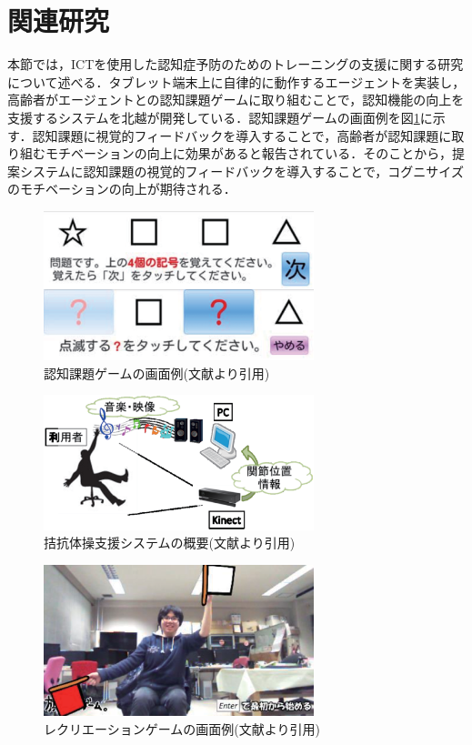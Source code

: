 \section{関連研究}
本節では，ICTを使用した認知症予防のためのトレーニングの支援に関する研究について述べる．タブレット端末上に自律的に動作するエージェントを実装し，高齢者がエージェントとの認知課題ゲームに取り組むことで，認知機能の向上を支援するシステム\cite{記憶力ゲーム}を北越が開発している．認知課題ゲームの画面例を図\ref{fig:cognition_system}に示す．認知課題に視覚的フィードバックを導入することで，高齢者が認知課題に取り組むモチベーションの向上に効果があると報告されている．そのことから，提案システムに認知課題の視覚的フィードバックを導入することで，コグニサイズのモチベーションの向上が期待される．



\begin{figure}[tbp]
	\centering
			\includegraphics[width=0.7\textwidth]{chap1-figure/cognition_system.eps}
	\caption{認知課題ゲームの画面例(文献\cite{記憶力ゲーム}より引用)}
	\label{fig:cognition_system}
\end{figure}

\begin{figure}[tbp]
	\centering
			\includegraphics[width=0.7\textwidth]{chap1-figure/antagonism_system.eps}
	\caption{拮抗体操支援システムの概要(文献より引用)}
	\label{fig:antagonism_system}
\end{figure}

\begin{figure}[tbp]
	\centering
			\includegraphics[width=0.7\textwidth]{chap1-figure/upper_limbs_system.eps}
	\caption{レクリエーションゲームの画面例(文献より引用)}
	\label{fig:upper_limbs_system}
\end{figure}


